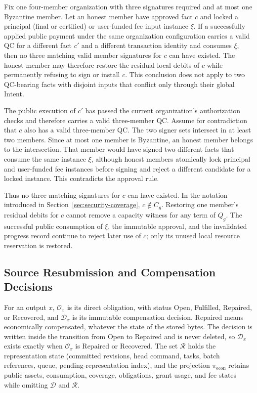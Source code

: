 \begin{lemma}
\label{lem:security-superseded}
Fix one four-member organization with three signatures required and at
most one Byzantine member.  Let an honest member have approved fact
$c$ and locked a principal (final or certified) or user-funded fee input instance $\xi$.
If a successfully applied public payment under the same organization
configuration carries a valid QC for a different fact $c'$ and a different
transaction identity and consumes $\xi$, then no three matching valid
member signatures for $c$ can have existed. The honest member may therefore
restore the residual local debits of $c$ while permanently refusing to
sign or install $c$.  This conclusion does not apply to two
QC-bearing facts with disjoint inputs that conflict only through their
global Intent.
\end{lemma}

\begin{IEEEproof}
The public execution of $c'$ has passed the current organization's
authorization checks and therefore carries a valid three-member QC.
Assume for contradiction that $c$ also has a valid three-member QC.
The two signer sets intersect in at least two members.  Since at most
one member is Byzantine, an honest member belongs to the intersection.
That member would have signed two different facts that consume the
same instance $\xi$, although honest members atomically lock principal
and user-funded fee instances before signing and reject a different
candidate for a locked instance.  This contradicts the approval rule.

Thus no three matching signatures for $c$ can have existed. In the
notation introduced in Section~\ref{sec:security-coverage}, $c\notin C_g$.
Restoring one member's residual debits for $c$ cannot remove
a capacity witness for any term of $Q_g$.  The successful public
consumption of $\xi$, the immutable approval, and the invalidated
progress record continue to reject later use of $c$; only its unused
local resource reservation is restored.
\end{IEEEproof}

\subsection{Source Resubmission and Compensation Decisions}
\label{sec:security-decision}

For an output $x$, $\mathcal O_x$ is its direct obligation, with status Open, Fulfilled, Repaired, or Recovered, and $\mathcal D_x$ is its immutable compensation decision. Repaired means economically compensated, whatever the state of the stored bytes. The decision is written inside the transition from Open to Repaired and is never deleted, so $\mathcal D_x$ exists exactly when $\mathcal O_x$ is Repaired or Recovered. The set $\mathcal R$ holds the representation state (committed revisions, head command, tasks, batch references, queue, pending-representation index), and the projection $\pi_{\mathrm{econ}}$ retains public assets, consumption, coverage, obligations, grant usage, and fee states while omitting $\mathcal D$ and $\mathcal R$.


